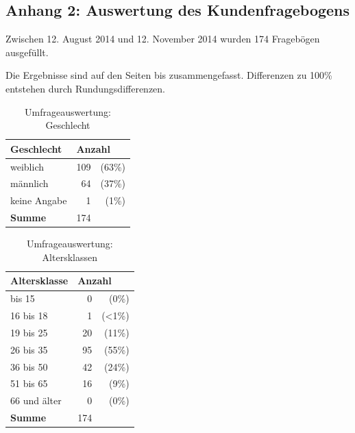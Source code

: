 \newpage
\subsection*{Anhang 2: Auswertung des Kundenfragebogens}

Zwischen 12. August 2014 und 12. November 2014 wurden 174 Fragebögen ausgefüllt. 

Die Ergebnisse sind auf den Seiten \pageref{pic:aus1} bis \pageref{pic:aus4b} zusammengefasst. Differenzen zu 100\% entstehen durch Rundungsdifferenzen.

\begin{table}[H]
\begin{center}
\begin{footnotesize}
\begin{tabular}{| l | r  r |}  \hline                       
  \textbf{Geschlecht}              & \multicolumn{2}{|l|}{\textbf{Anzahl}}   \\ \hline 
  weiblich        &  109 &   (63\%)  \\  \hline  
  männlich        &  64  &   (37\%)  \\  \hline  
  keine Angabe    &  1   &   (1\%)  \\  \hline  
  \textbf{Summe}  & 174  &   \\  \hline  
\end{tabular}
\end{footnotesize}
\caption{Umfrageauswertung: Geschlecht}
\label{tab:geschlecht}
\end{center}
\end{table}

\begin{table}[H]
\begin{center}
\begin{footnotesize}
\begin{tabular}{| l | r  r |}  \hline                       
  \textbf{Altersklasse}              & \multicolumn{2}{|l|}{\textbf{Anzahl}}   \\ \hline 
  bis 15          &  0 &   (0\%)  \\  \hline  
  16 bis 18       &  1 &   (<1\%)  \\  \hline  
  19 bis 25       & 20  &   (11\%)  \\  \hline  
  26 bis 35       & 95  &   (55\%)  \\  \hline  
  36 bis 50       & 42  &   (24\%)  \\  \hline  
  51 bis 65       & 16  &   (9\%)  \\  \hline  
  66 und älter    & 0  &   (0\%)  \\  \hline  
  \textbf{Summe}  & 174  &   \\  \hline  
\end{tabular}
\end{footnotesize}
\caption{Umfrageauswertung: Altersklassen}
\label{tab:altersklassen}
\end{center}
\end{table}

